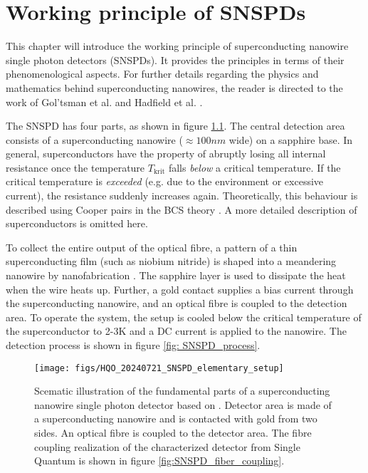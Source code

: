 \graphicspath{{/Users/maxim.re/Studium/Physik B.Sc./Semester_8_SS24/Proseminar/Figs Single Photon Detection/}}

\chapter{Working principle of SNSPDs}
\label{sec:SNSPD_working_principle}
This chapter will introduce the working principle of superconducting nanowire single photon detectors (SNSPDs).
It provides the principles in terms of their phenomenological aspects.
For further details regarding the physics and mathematics behind superconducting nanowires, the reader is directed
to the work of Gol’tsman et al. \cite{goltsman-2001} and Hadfield et al. \cite{natarajan-2012}.

The SNSPD has four parts, as shown in figure \ref{fig:SNSPD_rough_structure}.
The central detection area consists of a superconducting nanowire ($\approx 100nm$ wide) on a sapphire base.
In general, superconductors have the property of abruptly losing all internal resistance once the temperature
$T_{\text{krit}}$ falls \textit{below} a critical temperature.
If the critical temperature is \textit{exceeded} (e.g. due to the environment or excessive current),
the resistance suddenly increases again.
Theoretically, this behaviour is described using Cooper pairs in the BCS theory \cite{bardeen-1957}.
A more detailed description of superconductors is omitted here.

To collect the entire output of the optical fibre, a pattern of a
thin superconducting film (such as niobium nitride) is shaped into a meandering nanowire by nanofabrication \cite{single-quantum-2022}.
The sapphire layer is used to dissipate the heat when the wire heats up.
Further, a gold contact supplies a bias current through the superconducting nanowire, and an optical fibre is coupled to the detection area.
To operate the system, the setup is cooled below the critical temperature of the superconductor to
2-3K and a DC current is applied to the nanowire.
The detection process is shown in figure \ref{fig: SNSPD_process}.

\begin{figure}[hhh]
    \centering
    \texttt{[image: figs/HQO\_20240721\_SNSPD\_elementary\_setup]}
    \caption{Scematic illustration of the fundamental parts of a superconducting nanowire single photon detector based on \cite{steudle-2012}.
    Detector area is made of a superconducting nanowire and is contacted with gold from two sides.
    An optical fibre is coupled to the detector area.
    The fibre coupling realization of the characterized detector from Single Quantum is shown in figure \ref{fig:SNSPD_fiber_coupling}.}
    \label{fig:SNSPD_rough_structure}
\end{figure}


